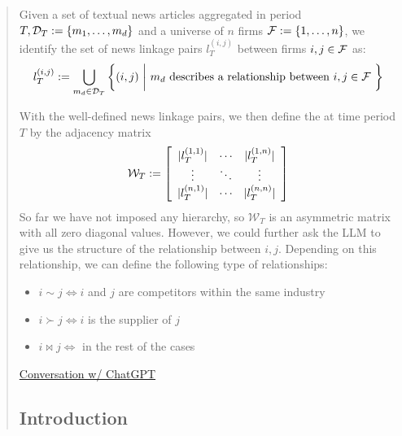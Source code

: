 \begin{quote}

Given a set of textual news articles aggregated in period $T, \mathcal{D}_T:=\left\{m_1, \ldots, m_d\right\}$ and a universe of $n$ firms $\mathcal{F} :=\{1, \ldots, n\}$, we identify the set of news linkage pairs $l^{(i,j)}_T$ between firms $i, j \in \mathcal{F} $ as:
$$
l^{(i,j)}_T
:=
 \bigcup_{m_d \in \mathcal{D}_T}\bigg{\{}  (i, j) ~\bigg{|}~ 
m_d \text{ describes a relationship between }i, j \in \mathcal{F} ~\text{}
 \bigg{\}}
$$


With the well-defined news linkage pairs, we then define the  at time period $T$ by the adjacency matrix 
$$
\mathcal{W}_T := 
\left[
\begin{array}{ccc}
	|l^{(1,1)}_T| 		& \cdots  	& |l^{(1,n)}_T|
	\\
	\vdots				& \ddots 	& \vdots 
	\\
	|l^{(n,1)}_T|		& \cdots  	& |l^{(n,n)}_T|
\end{array}
\right]
$$
So far we have not imposed any hierarchy, so $\mathcal{W}_T$ is an asymmetric matrix with all zero diagonal values. However, we could further ask the LLM to give us the structure of the relationship between $i,j$. Depending on this relationship, we can define the following type of relationships: 
\begin{itemize}
  \item $i \sim j \iff i$ and $j$ are competitors within the same industry 
  \item $i \succ j \iff i $ is the supplier of $j$
  \item $i \bowtie j \iff $ in the rest of the cases
\end{itemize}


\Vhrulefill
{\center \href{https://chatgpt.com/share/66f342fc-07f0-800d-9210-0506f9c26169}{Conversation w/ ChatGPT}
\par}
\Vhrulefill


\subsection{Introduction}


\end{quote}
